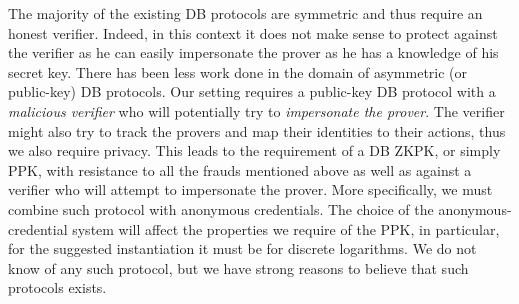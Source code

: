 The majority of the existing \ac{DB} protocols are symmetric and thus require an honest verifier.
Indeed, in this context it does not make sense to protect against the verifier as he can easily impersonate the prover as he has a knowledge of his secret key.
There has been less work done in the domain of asymmetric (or public-key) \ac{DB} protocols.
Our setting requires a public-key \ac{DB} protocol with a \emph{malicious verifier} who will potentially try to \emph{impersonate the prover}.
The verifier might also try to track the provers and map their identities to their actions, thus we also require privacy.
This leads to the requirement of a \ac{DB} \ac{ZKPK}, or simply \ac{PPK}, with resistance to all the frauds mentioned above as well as against a verifier who will attempt to impersonate the prover.
More specifically, we must combine such  protocol with anonymous 
credentials.
The choice of the anonymous-credential system will affect the properties we 
require of the \ac{PPK}, in particular, for the suggested instantiation it must 
be  for discrete logarithms.
We do not know of any such protocol, but we have strong reasons to believe that 
such protocols exists.
